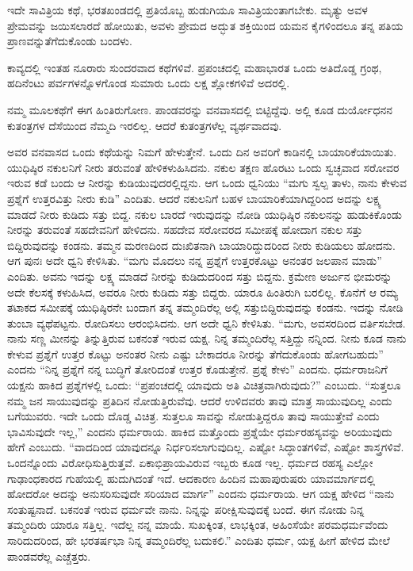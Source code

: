 \vskip 0.1cm

ಇದೇ ಸಾವಿತ್ರಿಯ ಕಥೆ, ಭರತಖಂಡದಲ್ಲಿ ಪ್ರತಿಯೊಬ್ಬ ಹುಡುಗಿಯೂ ಸಾವಿತ್ರಿಯಂತಾಗಬೇಕು. ಮೃತ್ಯು ಅವಳ ಪ್ರೇಮವನ್ನು ಜಯಿಸಲಾರದೆ ಹೋಯಿತು, ಅವಳು ಪ್ರೇಮದ ಅದ್ಭುತ ಶಕ್ತಿಯಿಂದ ಯಮನ ಕೈಗಳಿಂದಲೂ ತನ್ನ ಪತಿಯ ಪ್ರಾಣವನ್ನು\break ತೆಗೆದುಕೊಂಡು ಬಂದಳು.

\vskip 0.1cm

ಕಾವ್ಯದಲ್ಲಿ ಇಂತಹ ನೂರಾರು ಸುಂದರವಾದ ಕಥೆಗಳಿವೆ. ಪ್ರಪಂಚದಲ್ಲಿ ಮಹಾಭಾರತ ಒಂದು ಅತಿದೊಡ್ಡ ಗ್ರಂಥ, ಹದಿನೆಂಟು ಪರ್ವಗಳನ್ನೊಳಗೊಂಡ ಸುಮಾರು ಒಂದು ಲಕ್ಷ ಶ್ಲೋಕಗಳಿವೆ ಅದರಲ್ಲಿ.

\vskip 0.1cm

ನಮ್ಮ ಮೂಲಕಥೆಗೆ ಈಗ ಹಿಂತಿರುಗೋಣ. ಪಾಂಡವರನ್ನು ವನವಾಸದಲ್ಲಿ ಬಿಟ್ಟಿದ್ದೆವು. ಅಲ್ಲಿ ಕೂಡ ದುರ್ಯೋಧನನ ಕುತಂತ್ರಗಳ ದೆಸೆಯಿಂದ ನೆಮ್ಮದಿ ಇರಲಿಲ್ಲ. ಆದರೆ ಕುತಂತ್ರಗಳೆಲ್ಲ ವ್ಯರ್ಥವಾದವು.

\vskip 0.1cm

ಅವರ ವನವಾಸದ ಒಂದು ಕಥೆಯನ್ನು ನಿಮಗೆ ಹೇಳುತ್ತೇನೆ. ಒಂದು ದಿನ ಅವರಿಗೆ ಕಾಡಿನಲ್ಲಿ ಬಾಯಾರಿಕೆಯಾಯಿತು. ಯುಧಿಷ್ಠಿರ ನಕುಲನಿಗೆ ನೀರು ತರುವಂತೆ ಹೇಳಿಕಳುಹಿಸಿದನು. ನಕುಲ ತಕ್ಷಣ ಹೊರಟು ಒಂದು ಸ್ವಚ್ಛವಾದ ಸರೋವರ ಇರುವ ಕಡೆ ಬಂದು ಆ ನೀರನ್ನು ಕುಡಿಯುವುದರಲ್ಲಿದ್ದನು. ಆಗ ಒಂದು ಧ್ವನಿಯು “ಮಗು ಸ್ವಲ್ಪ ತಾಳು, ನಾನು ಕೇಳುವ ಪ್ರಶ್ನೆಗೆ ಉತ್ತರವಿತ್ತು ನೀರು ಕುಡಿ” ಎಂದಿತು. ಆದರೆ ನಕುಲನಿಗೆ ಬಹಳ ಬಾಯಾರಿಕೆಯಾಗಿದ್ದರಿಂದ ಅದನ್ನು ಲಕ್ಷ್ಯ ಮಾಡದೆ ನೀರು ಕುಡಿದು ಸತ್ತು ಬಿದ್ದ. ನಕುಲ ಬಾರದೆ ಇರುವುದನ್ನು ನೋಡಿ ಯುಧಿಷ್ಠಿರ ನಕುಲನನ್ನು ಹುಡುಕಿಕೊಂಡು ನೀರನ್ನು ತರುವಂತೆ ಸಹದೇವನಿಗೆ ಹೇಳಿದನು. ಸಹದೇವ ಸರೋವರದ ಸಮೀಪಕ್ಕೆ ಹೋದಾಗ ನಕುಲ ಸತ್ತು ಬಿದ್ದಿರುವುದನ್ನು ಕಂಡನು. ತಮ್ಮನ ಮರಣದಿಂದ ದುಃಖಿತನಾಗಿ ಬಾಯಾರಿದ್ದುದರಿಂದ ನೀರು ಕುಡಿಯಲು ಹೋದನು. ಆಗ ಪುನಃ ಅದೇ ಧ್ವನಿ ಕೇಳಿಸಿತು. “ಮಗು ಮೊದಲು ನನ್ನ ಪ್ರಶ್ನೆಗೆ ಉತ್ತರಕೊಟ್ಟು ಅನಂತರ ಜಲಪಾನ ಮಾಡು” ಎಂದಿತು. ಅವನು ಇದನ್ನು ಲಕ್ಷ್ಯ ಮಾಡದೆ ನೀರನ್ನು ಕುಡಿದುದರಿಂದ ಸತ್ತು ಬಿದ್ದನು. ಕ್ರಮೇಣ ಅರ್ಜುನ ಭೀಮರನ್ನು ಅದೇ ಕೆಲಸಕ್ಕೆ ಕಳುಹಿಸಿದ, ಅವರೂ ನೀರು ಕುಡಿದು ಸತ್ತು ಬಿದ್ದರು. ಯಾರೂ ಹಿಂತಿರುಗಿ ಬರಲಿಲ್ಲ. ಕೊನೆಗೆ ಆ ರಮ್ಯ ತಟಾಕದ ಸಮೀಪಕ್ಕೆ ಯುಧಿಷ್ಠಿರನೇ ಬಂದಾಗ ತನ್ನ ತಮ್ಮಂದಿರೆಲ್ಲ ಅಲ್ಲಿ ಸತ್ತುಬಿದ್ದಿರುವುದನ್ನು ಕಂಡನು. ಇದನ್ನು ನೋಡಿ ತುಂಬಾ ವ್ಯಥೆಪಟ್ಟನು. ರೋದಿಸಲು ಆರಂಭಿಸಿದನು. ಆಗ ಅದೇ ಧ್ವನಿ ಕೇಳಿಸಿತು. “ಮಗು, ಅವಸರದಿಂದ ವರ್ತಿಸಬೇಡ. ನಾನು ಸಣ್ಣ ಮೀನನ್ನು ತಿನ್ನುತ್ತಿರುವ ಬಕನಂತೆ ಇರುವ ಯಕ್ಷ. ನಿನ್ನ ತಮ್ಮಂದಿರೆಲ್ಲ ಸತ್ತಿದ್ದು ನನ್ನಿಂದ. ನೀನು ಕೂಡ ನಾನು ಕೇಳುವ ಪ್ರಶ್ನೆಗೆ ಉತ್ತರ ಕೊಟ್ಟು ಅನಂತರ ನೀನು ಎಷ್ಟು ಬೇಕಾದರೂ ನೀರನ್ನು ತೆಗೆದುಕೊಂಡು ಹೋಗಬಹುದು” ಎಂದನು “ನಿನ್ನ ಪ್ರಶ್ನೆಗೆ ನನ್ನ ಬುದ್ಧಿಗೆ ತೋರಿದಂತೆ ಉತ್ತರ ಕೊಡುತ್ತೇನೆ. ಪ್ರಶ್ನೆ ಕೇಳು” ಎಂದನು. ಧರ್ಮರಾಜನಿಗೆ ಯಕ್ಷನು ಹಾಕಿದ ಪ್ರಶ್ನೆಗಳಲ್ಲಿ ಒಂದು: “ಪ್ರಪಂಚದಲ್ಲಿ ಯಾವುದು ಅತಿ ವಿಚಿತ್ರವಾಗಿರುವುದು?” ಎಂಬುದು. “ಸುತ್ತಲೂ ನಮ್ಮ ಜನ ಸಾಯುವುದನ್ನು ಪ್ರತಿದಿನ ನೋಡುತ್ತಿರುವೆವು. ಆದರೆ ಉಳಿದವರು ತಾವು ಮಾತ್ರ ಸಾಯುವುದಿಲ್ಲ ಎಂದು ಬಗೆಯುವರು. ಇದೇ ಒಂದು ದೊಡ್ಡ ವಿಚಿತ್ರ. ಸುತ್ತಲೂ ಸಾವನ್ನು ನೋಡುತ್ತಿದ್ದರೂ ತಾವು ಸಾಯುತ್ತೇವೆ ಎಂದು ಭಾವಿಸುವುದೇ ಇಲ್ಲ,” ಎಂದನು ಧರ್ಮರಾಯ. ಹಾಕಿದ ಮತ್ತೊಂದು ಪ್ರಶ್ನೆಯೇ ಧರ್ಮರಹಸ್ಯವನ್ನು ಅರಿಯುವುದು ಹೇಗೆ ಎಂಬುದು. “ವಾದದಿಂದ ಯಾವುದನ್ನೂ ನಿರ್ಧರಿಸಲಾಗುವುದಿಲ್ಲ. ಎಷ್ಟೋ ಸಿದ್ಧಾಂತಗಳಿವೆ, ಎಷ್ಟೋ ಶಾಸ್ತ್ರಗಳಿವೆ. ಒಂದನ್ನೊಂದು ವಿರೋಧಿಸುತ್ತಿರುತ್ತವೆ. ಏಕಾಭಿಪ್ರಾಯವಿರುವ ಇಬ್ಬರು ಕೂಡ ಇಲ್ಲ. ಧರ್ಮದ ರಹಸ್ಯ ಎಲ್ಲೋ ಗಾಢಾಂಧಕಾರದ ಗುಹೆಯಲ್ಲಿ ಹುದುಗಿದಂತೆ ಇದೆ. ಆದಕಾರಣ ಹಿಂದಿನ ಮಹಾಪುರುಷರು ಯಾವ\break ಮಾರ್ಗದಲ್ಲಿ ಹೋದರೋ ಅದನ್ನು ಅನುಸರಿಸುವುದೇ ಸರಿಯಾದ ಮಾರ್ಗ” ಎಂದನು ಧರ್ಮರಾಯ. ಆಗ ಯಕ್ಷ ಹೇಳಿದ “ನಾನು ಸಂತುಷ್ಟನಾದೆ. ಬಕನಂತೆ ಇರುವ ಧರ್ಮವೇ ನಾನು. ನಿನ್ನನ್ನು ಪರೀಕ್ಷಿಸುವುದಕ್ಕೆ ಬಂದೆ. ಈಗ ನೋಡು ನಿನ್ನ ತಮ್ಮಂದಿರು ಯಾರೂ ಸತ್ತಿಲ್ಲ. ಇದೆಲ್ಲ ನನ್ನ ಮಾಯೆ. ಸುಖಕ್ಕಿಂತ, ಲಾಭಕ್ಕಿಂತ, ಅಹಿಂಸೆಯೇ ಪರಮಧರ್ಮವೆಂದು ಸಾರಿದುದರಿಂದ, ಹೇ ಭರತರ್ಷಭಾ ನಿನ್ನ ತಮ್ಮಂದಿರೆಲ್ಲ ಬದುಕಲಿ.” ಎಂದಿತು ಧರ್ಮ, ಯಕ್ಷ ಹೀಗೆ ಹೇಳಿದ ಮೇಲೆ ಪಾಂಡವರೆಲ್ಲ ಎಚ್ಚೆತ್ತರು.


